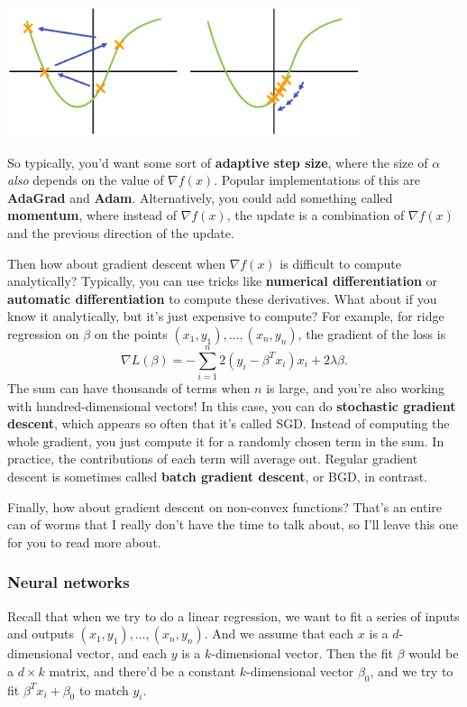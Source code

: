 \documentclass[11pt,paper=letter]{scrartcl}
\begin{document}
\begin{center}
  \includegraphics[height=1.5in]{24.png}
\end{center}

So typically, you'd want some sort of \textbf{adaptive step size}, where the size of $\alpha$ \textit{also} depends on the value of $\nabla f(x)$. Popular implementations of this are \textbf{AdaGrad} and \textbf{Adam}. Alternatively, you could add something called \textbf{momentum}, where instead of $\nabla f(x)$, the update is a combination of $\nabla f(x)$ and the previous direction of the update.

Then how about gradient descent when $\nabla f(x)$ is difficult to compute analytically? Typically, you can use tricks like \textbf{numerical differentiation} or \textbf{automatic differentiation} to compute these derivatives. What about if you know it analytically, but it's just expensive to compute? For example, for ridge regression on $\beta$ on the points $(x_1, y_1), \ldots, (x_n, y_n)$, the gradient of the loss is
\[
  \nabla L(\beta) = -\sum_{i=1}^n 2\left(y_i - \beta^Tx_i\right)x_i + 2\lambda\beta.
\]
The sum can have thousands of terms when $n$ is large, and you're also working with hundred-dimensional vectors! In this case, you can do \textbf{stochastic gradient descent}, which appears so often that it's called SGD. Instead of computing the whole gradient, you just compute it for a randomly chosen term in the sum. In practice, the contributions of each term will average out. Regular gradient descent is sometimes called \textbf{batch gradient descent}, or BGD, in contrast.

Finally, how about gradient descent on non-convex functions? That's an entire can of worms that I really don't have the time to talk about, so I'll leave this one for you to read more about.

\subsubsection*{Neural networks}

Recall that when we try to do a linear regression, we want to fit a series of inputs and outputs $(x_1, y_1), \ldots, (x_n, y_n)$. And we assume that each $x$ is a $d$-dimensional vector, and each $y$ is a $k$-dimensional vector. Then the fit $\beta$ would be a $d \times k$ matrix, and there'd be a constant $k$-dimensional vector $\beta_0$, and we try to fit $\beta^Tx_i + \beta_0$ to match $y_i$.
\end{document}
